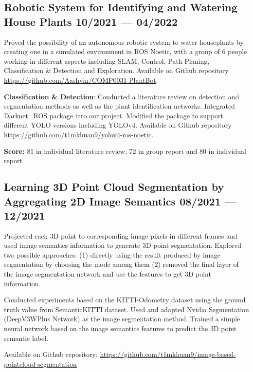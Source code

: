 \subsection{
    Robotic System for Identifying and Watering House Plants 
    \hfill 10/2021 --- 04/2022
}
    \begin{zitemize}
        \item   Proved the possibility of an autonomous robotic system to water houseplants
                by creating one in a simulated environment in ROS Noetic, 
                with a group of 6 people working in different aspects including
                SLAM, Control, Path Planing, Classification \& Detection and Exploration.
                Available on Github repository
                \url{https://github.com/Aashvin/COMP0031-PlantBot}.
        \item   \textbf{Classification \& Detection}: 
                Conducted a literature review on detection and 
                segmentation methods as well as the plant identification networks.
                Integrated Darknet\_ROS package into our project.
                Modified the package to support different YOLO versions including YOLOv4.
                Available on Github repository
                \url{https://github.com/t1mkhuan9/yolov4-ros-noetic}.
        \item   \textbf{Score:}
                81 in individual literature review, 72 in group report and 80 in individual report
    \end{zitemize}


\subsection{
    Learning 3D Point Cloud Segmentation by Aggregating 2D Image Semantics
    \hfill 08/2021 --- 12/2021
}
    \begin{zitemize}
        \item   Projected each 3D point to corresponding image pixels in different frames
                and used image semantics information to generate 3D point segmentation.
                Explored two possible approaches:
                (1) directly using the result produced by image segmentation by choosing
                the mode among them
                (2) removed the final layer of the image segmentation network and use the
                features to get 3D point information.
        \item   Conducted experiments based on the KITTI-Odometry dataset using the 
                ground truth value from SemanticKITTI dataset.
                Used and adapted Nvidia Segmentation (DeepV3WPlus Network) as the image
                segmentation method.
                Trained a simple neural network based on the image semantics features to
                predict the 3D point semantic label.
        \item   Available on Github repository: \url{https://github.com/t1mkhuan9/image-based-pointcloud-segmentation}
    \end{zitemize}
